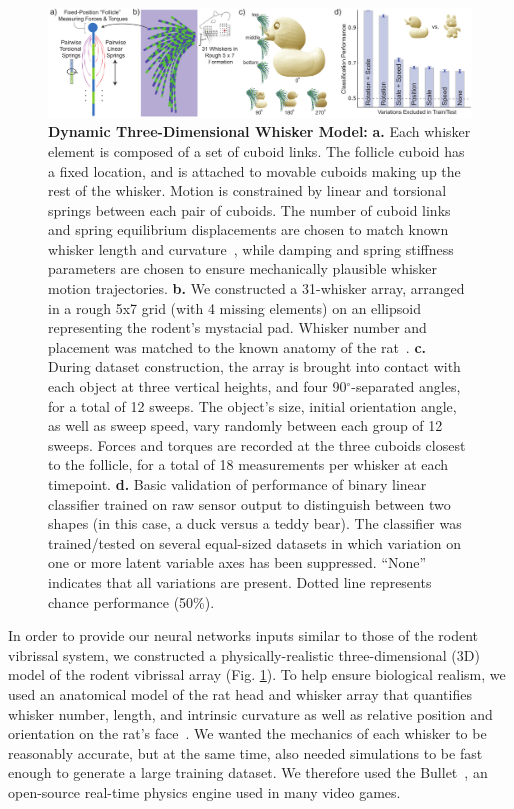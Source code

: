 \begin{figure}
\FigCenter
\includegraphics [width=\DefaultFigSize\linewidth]{figures/whiskers.pdf}
\vspace{-3mm}
\caption{\footnotesize{\textbf{Dynamic Three-Dimensional Whisker Model:} \textbf{a.} Each whisker element is composed of a set of cuboid links. 
The follicle cuboid has a fixed location, and is attached to movable cuboids making up the rest of the whisker. 
Motion is constrained by linear and torsional springs between each pair of cuboids. 
The number of cuboid links and spring equilibrium displacements are chosen to match known whisker length and curvature~\cite{Towal2011}, while damping and spring stiffness parameters are chosen to ensure mechanically plausible whisker motion trajectories.  
\textbf{b.} We constructed a 31-whisker array, arranged in a rough 5x7 grid (with 4 missing elements) on an ellipsoid representing the rodent's mystacial pad.  Whisker number and placement was matched to the known anatomy of the rat~\cite{Towal2011}.
\textbf{c.} During dataset construction, the array is brought into contact with each object at three vertical heights, and four 90$^{\circ}$-separated angles, for a total of 12 sweeps.  
The object's size, initial orientation angle, as well as sweep speed, vary randomly between each group of 12 sweeps. 
Forces and torques are recorded at the three cuboids closest to the follicle, for a total of 18 measurements per whisker at each timepoint. 
\textbf{d.} Basic validation of performance of binary linear classifier trained on raw sensor output to distinguish between two shapes (in this case, a duck versus a teddy bear).  The classifier was trained/tested on several equal-sized datasets in which variation on one or more latent variable axes has been suppressed. ``None'' indicates that all variations are present.  Dotted line represents chance performance (50\%).}~\label{fig_whiskers}}
\vspace{-6mm}
\end{figure}

In order to provide our neural networks inputs similar to those of the rodent vibrissal system, we constructed a physically-realistic three-dimensional (3D) model of the rodent vibrissal array (Fig. \ref{fig_whiskers}).  
To help ensure biological realism, we used an anatomical model of the rat head and whisker array that quantifies whisker number, length, and intrinsic curvature as well as relative position and orientation on the rat's face~\cite{Towal2011}.
We wanted the mechanics of each whisker to be reasonably accurate, but at the same time, also needed simulations to be fast enough to generate a large training dataset.   
We therefore used the Bullet~\cite{wiki:bullet}, an open-source real-time physics engine used in many video games. 


